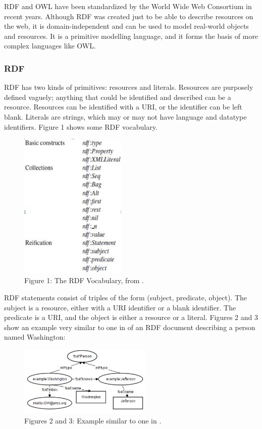 \documentclass[10pt,journal,compsoc]{IEEEtran}
\begin{document}
RDF and OWL have been standardized by the World Wide Web Consortium in recent years.  Although RDF was created just to be able to describe resources on the web, it is domain-independent and can be used to model real-world objects and resources.  It is a primitive modelling language, and it forms the basis of more complex languages like OWL.



\subsubsection{RDF}
RDF has two kinds of primitives: resources and literals.  Resources are purposely defined vaguely; anything that could be identified and described can be a resource.  Resources can be identified with a URI, or the identifier can be left blank.  Literals are strings, which may or may not have language and datatype identifiers.  Figure 1 shows some RDF vocabulary.

\begin{figure}[htbp] %
   \centering
   \includegraphics[width=2in]{RDFVocabPic.jpg} 
\caption*{Figure 1: The RDF Vocabulary, from \cite{_social_2007}.}
   \label{}
\label{}   
\end{figure}


RDF statements consist of triples of the form (subject, predicate, object).  The subject is a resource, either with a URI identifier or a blank identifier.  The predicate is a URI, and the object is either a resource or a literal. Figures 2 and 3 show an example very similar to one in \cite{_social_2007} of an RDF document describing a person named Washington: 

\begin{figure}[h] %
   \centering
   \includegraphics[width=2.5in]{WashJeffPic.jpg} 
\caption*{Figures 2 and 3: Example similar to one in \cite{_social_2007}.}
   \label{}
\label{}   
\end{figure}
\end{document}

